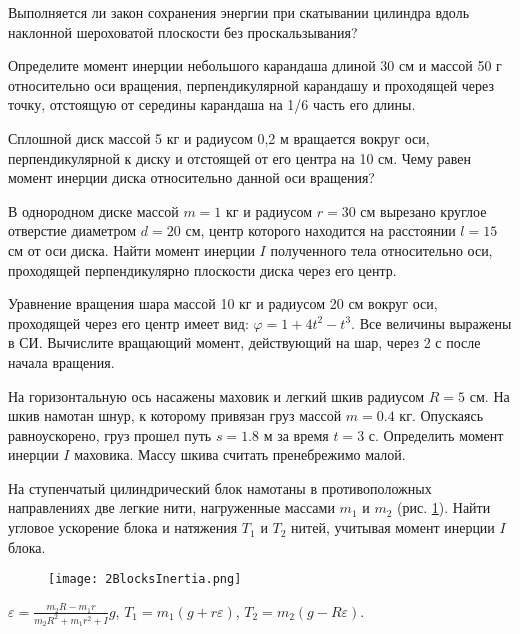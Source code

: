 \begin{ex}
Выполняется ли закон сохранения энергии при скатывании цилиндра вдоль наклонной шероховатой плоскости без проскальзывания?
\end{ex}	

\simpleProblems

\begin{ex}
Определите момент инерции небольшого карандаша длиной 30 см и массой 50 г относительно оси вращения, перпендикулярной карандашу и проходящей через точку, отстоящую от середины карандаша на 1/6 часть его длины.
\end{ex}	

\begin{ex}
Сплошной диск массой 5 кг и радиусом 0,2 м вращается вокруг оси, перпендикулярной к диску и отстоящей от его центра на 10 см. Чему равен момент инерции диска относительно данной оси вращения?
\end{ex}	

\begin{ex}
В однородном диске массой $m = 1$ кг и радиусом $r = 30$ см вырезано круглое отверстие диаметром $d = 20$ см, центр которого находится на расстоянии $l = 15$ см от оси диска. Найти момент инерции $I$ полученного тела относительно оси, проходящей перпендикулярно плоскости диска через его центр.
\end{ex}	

\begin{ex}
Уравнение вращения шара массой 10 кг и радиусом 20 см вокруг оси, проходящей через его центр имеет вид: $\varphi = 1 + 4t^2 - t^3$. Все величины выражены в СИ. Вычислите вращающий момент, действующий на шар, через 2 с после начала вращения.
\end{ex}	

\begin{ex}
На горизонтальную ось насажены маховик и легкий шкив радиусом $R = 5$ см. На шкив намотан шнур, к которому привязан груз массой $m = 0.4$ кг. Опускаясь равноускорено, груз прошел путь $s = 1.8$ м за время $t = 3$ с. Определить момент инерции $I$ маховика. Массу шкива считать пренебрежимо малой.
\end{ex}	

\complexProblems

\begin{ex} %
На ступенчатый цилиндрический блок намотаны в противоположных направлениях две легкие нити, нагруженные массами $m_1$ и $m_2$ (рис. \ref{2BlocksInertia}). Найти угловое ускорение блока и натяжения $T_1$ и $T_2$ нитей, учитывая момент инерции $I$ блока.

\begin{figure}[h]
\centering
\texttt{[image: 2BlocksInertia.png]}
\caption{}
\label{2BlocksInertia}
\end{figure}

\begin{ans}
$\varepsilon = \frac{m_2R - m_1r}{m_2R^2 + m_1r^2 + I}g$, $T_1 = m_1(g+r\varepsilon)$, $T_2 = m_2(g-R\varepsilon)$.
\end{ans}
\end{ex}	

